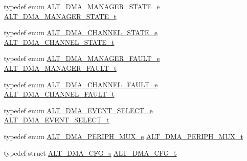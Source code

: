 \begin{DoxyCompactItemize}
\item 
typedef enum \mbox{\hyperlink{group__ALT__DMA__CSR_ga451e51b97a5b2a5ff8e37e0b7f0a14de}{A\+L\+T\+\_\+\+D\+M\+A\+\_\+\+M\+A\+N\+A\+G\+E\+R\+\_\+\+S\+T\+A\+T\+E\+\_\+e}} \mbox{\hyperlink{group__ALT__DMA__CSR_ga7037ee411489693c9d62b992b99339b7}{A\+L\+T\+\_\+\+D\+M\+A\+\_\+\+M\+A\+N\+A\+G\+E\+R\+\_\+\+S\+T\+A\+T\+E\+\_\+t}}
\item 
typedef enum \mbox{\hyperlink{group__ALT__DMA__CSR_ga9d1bf45cfd52c9e0c603c1462b32ea50}{A\+L\+T\+\_\+\+D\+M\+A\+\_\+\+C\+H\+A\+N\+N\+E\+L\+\_\+\+S\+T\+A\+T\+E\+\_\+e}} \mbox{\hyperlink{group__ALT__DMA__CSR_gaf21ed0aa09d2ac7cdbdf56da958e0b1a}{A\+L\+T\+\_\+\+D\+M\+A\+\_\+\+C\+H\+A\+N\+N\+E\+L\+\_\+\+S\+T\+A\+T\+E\+\_\+t}}
\item 
typedef enum \mbox{\hyperlink{group__ALT__DMA__CSR_gab44582b3022f4047c4cdd70b80155e44}{A\+L\+T\+\_\+\+D\+M\+A\+\_\+\+M\+A\+N\+A\+G\+E\+R\+\_\+\+F\+A\+U\+L\+T\+\_\+e}} \mbox{\hyperlink{group__ALT__DMA__CSR_gaca87b43fe85277c9791fe8f3c4d574a3}{A\+L\+T\+\_\+\+D\+M\+A\+\_\+\+M\+A\+N\+A\+G\+E\+R\+\_\+\+F\+A\+U\+L\+T\+\_\+t}}
\item 
typedef enum \mbox{\hyperlink{group__ALT__DMA__CSR_gafeda30cd49f28a7205b141ea8c653e3b}{A\+L\+T\+\_\+\+D\+M\+A\+\_\+\+C\+H\+A\+N\+N\+E\+L\+\_\+\+F\+A\+U\+L\+T\+\_\+e}} \mbox{\hyperlink{group__ALT__DMA__CSR_ga6bbb27dff1001aeef88e779c4e57874c}{A\+L\+T\+\_\+\+D\+M\+A\+\_\+\+C\+H\+A\+N\+N\+E\+L\+\_\+\+F\+A\+U\+L\+T\+\_\+t}}
\item 
typedef enum \mbox{\hyperlink{group__ALT__DMA__CSR_gaa5ef1fd8005d9b58f8da859d6a7c32c2}{A\+L\+T\+\_\+\+D\+M\+A\+\_\+\+E\+V\+E\+N\+T\+\_\+\+S\+E\+L\+E\+C\+T\+\_\+e}} \mbox{\hyperlink{group__ALT__DMA__CSR_gae4b36b414418458c2b8a3c2931a37a49}{A\+L\+T\+\_\+\+D\+M\+A\+\_\+\+E\+V\+E\+N\+T\+\_\+\+S\+E\+L\+E\+C\+T\+\_\+t}}
\item 
typedef enum \mbox{\hyperlink{group__ALT__DMA__CSR_ga0fde94fedf8b487aef8c5373221a8bad}{A\+L\+T\+\_\+\+D\+M\+A\+\_\+\+P\+E\+R\+I\+P\+H\+\_\+\+M\+U\+X\+\_\+e}} \mbox{\hyperlink{group__ALT__DMA__CSR_ga58c7617e50eb450a5435798a109a266d}{A\+L\+T\+\_\+\+D\+M\+A\+\_\+\+P\+E\+R\+I\+P\+H\+\_\+\+M\+U\+X\+\_\+t}}
\item 
typedef struct \mbox{\hyperlink{structALT__DMA__CFG__s}{A\+L\+T\+\_\+\+D\+M\+A\+\_\+\+C\+F\+G\+\_\+s}} \mbox{\hyperlink{group__ALT__DMA__CSR_ga45eeb28a3a41b762727db85583888f34}{A\+L\+T\+\_\+\+D\+M\+A\+\_\+\+C\+F\+G\+\_\+t}}
\end{DoxyCompactItemize}
